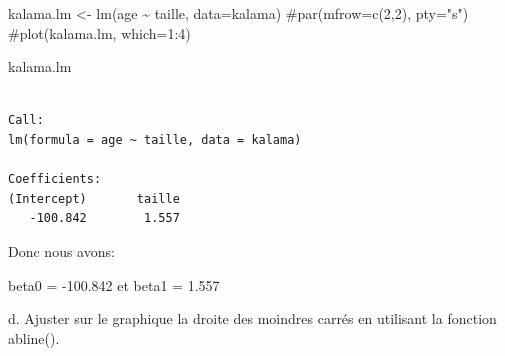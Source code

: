\documentclass[
  letterpaper,
  DIV=11,
  numbers=noendperiod]{scrartcl}
\newenvironment{Shaded}{}{}
\newcommand{\AttributeTok}[1]{\textcolor[rgb]{0.84,0.23,0.29}{#1}}
\newcommand{\CommentTok}[1]{\textcolor[rgb]{0.42,0.45,0.49}{#1}}
\newcommand{\DecValTok}[1]{\textcolor[rgb]{0.00,0.36,0.77}{#1}}
\newcommand{\FunctionTok}[1]{\textcolor[rgb]{0.44,0.26,0.76}{#1}}
\newcommand{\NormalTok}[1]{\textcolor[rgb]{0.14,0.16,0.18}{#1}}
\newcommand{\OtherTok}[1]{\textcolor[rgb]{0.44,0.26,0.76}{#1}}
\newcommand{\SpecialCharTok}[1]{\textcolor[rgb]{0.00,0.36,0.77}{#1}}
\newcommand{\StringTok}[1]{\textcolor[rgb]{0.01,0.18,0.38}{#1}}
\begin{document}
\begin{Shaded}
\begin{Highlighting}[]
\NormalTok{kalama.lm }\OtherTok{\textless{}{-}} \FunctionTok{lm}\NormalTok{(age }\SpecialCharTok{\textasciitilde{}}\NormalTok{ taille, }\AttributeTok{data=}\NormalTok{kalama)}
\CommentTok{\#par(mfrow=c(2,2), pty="s")}
\CommentTok{\#plot(kalama.lm, which=1:4)}
\end{Highlighting}
\end{Shaded}

\begin{Shaded}
\begin{Highlighting}[]
\NormalTok{kalama.lm}
\end{Highlighting}
\end{Shaded}

\begin{verbatim}

Call:
lm(formula = age ~ taille, data = kalama)

Coefficients:
(Intercept)       taille  
   -100.842        1.557  
\end{verbatim}

Donc nous avons:

beta0 = -100.842 et beta1 = 1.557

d. Ajuster sur le graphique la droite des moindres carrés en utilisant
la fonction abline().

\begin{Shaded}
\end{Shaded}
\end{document}
